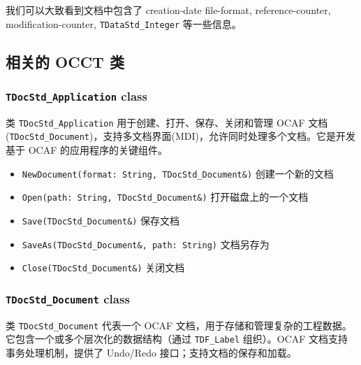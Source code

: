 \documentclass[11pt]{article}
\begin{document}
我们可以大致看到文档中包含了 creation-date file-format, reference-counter, modification-counter, \texttt{TDataStd\_Integer} 等一些信息。
\subsection{相关的 OCCT 类}
\label{sec:orga672623}

\subsubsection{\texttt{TDocStd\_Application} class}
\label{sec:org50fa42c}

类 \texttt{TDocStd\_Application} 用于创建、打开、保存、关闭和管理 OCAF 文档(\texttt{TDocStd\_Document})，支持多文档界面(MDI)，允许同时处理多个文档。它是开发基于 OCAF 的应用程序的关键组件。

\begin{itemize}
\item \texttt{NewDocument(format: String, TDocStd\_Document\&)} 创建一个新的文档
\item \texttt{Open(path: String, TDocStd\_Document\&)} 打开磁盘上的一个文档
\item \texttt{Save(TDocStd\_Document\&)} 保存文档
\item \texttt{SaveAs(TDocStd\_Document\&, path: String)} 文档另存为
\item \texttt{Close(TDocStd\_Document\&)} 关闭文档
\end{itemize}
\subsubsection{\texttt{TDocStd\_Document} class}
\label{sec:org6ce01a9}

类 \texttt{TDocStd\_Document} 代表一个 OCAF 文档，用于存储和管理复杂的工程数据。它包含一个或多个层次化的数据结构（通过 \texttt{TDF\_Label} 组织）。OCAF 文档支持事务处理机制，提供了 Undo/Redo 接口；支持文档的保存和加载。
\end{document}
